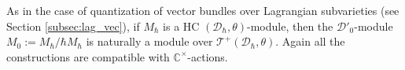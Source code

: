 \documentclass[12pt]{amsart}
\newcommand{\C}{\mathbb{C}}
\newcommand{\A}{\mathcal{A}}
\newcommand{\Orb}{\mathbb{O}}
\newcommand{\T}{\mathcal{T}}
\newcommand{\TT}{\mathscr{T}}
\newcommand{\per}{\operatorname{Per}}
\newcommand{\cm}{\C^\times}
\newcommand{\wt}{\widetilde}
\newcommand{\Weyl}{\mathbb{A}}
\newcommand{\Dcal}{\mathcal{D}}
\newtheorem{Lem}[Thm]{Lemma}
\theoremstyle{definition}
\numberwithin{equation}{section}
\begin{document}
As in the case of quantization of vector bundles over Lagrangian subvarieties (see Section \ref{subsec:lag_vec}), if $M_\hbar$ is a HC $(\Dcal_\hbar, \theta)$-module, then the $\Dcal'_0$-module $M_0 := M_\hbar / \hbar M_\hbar$ is naturally a module over $\T^+(\Dcal_\hbar, \theta)$. Again all the constructions are compatible with $\cm$-actions.

\end{document}
